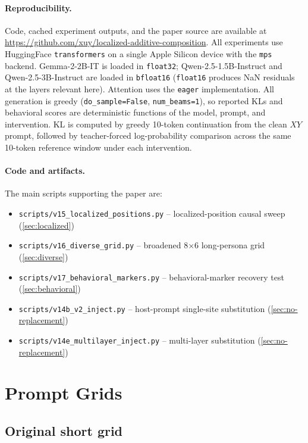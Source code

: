 \documentclass[11pt]{article}
\begin{document}
\paragraph{Reproducibility.}
Code, cached experiment outputs, and the paper source are available at \url{https://github.com/xuy/localized-additive-composition}. All experiments use HuggingFace \texttt{transformers} on a single Apple Silicon device with the \texttt{mps} backend. Gemma-2-2B-IT is loaded in \texttt{float32}; Qwen-2.5-1.5B-Instruct and Qwen-2.5-3B-Instruct are loaded in \texttt{bfloat16} (\texttt{float16} produces NaN residuals at the layers relevant here). Attention uses the \texttt{eager} implementation. All generation is greedy (\texttt{do\_sample=False}, \texttt{num\_beams=1}), so reported KLs and behavioral scores are deterministic functions of the model, prompt, and intervention. KL is computed by greedy 10-token continuation from the clean $XY$ prompt, followed by teacher-forced log-probability comparison across the same 10-token reference window under each intervention.

\paragraph{Code and artifacts.}
The main scripts supporting the paper are:
\begin{itemize}
    \item \texttt{scripts/v15\_localized\_positions.py} -- localized-position causal sweep (\cref{sec:localized})
    \item \texttt{scripts/v16\_diverse\_grid.py} -- broadened 8$\times$6 long-persona grid (\cref{sec:diverse})
    \item \texttt{scripts/v17\_behavioral\_markers.py} -- behavioral-marker recovery test (\cref{sec:behavioral})
    \item \texttt{scripts/v14b\_v2\_inject.py} -- host-prompt single-site substitution (\cref{sec:no-replacement})
    \item \texttt{scripts/v14e\_multilayer\_inject.py} -- multi-layer substitution (\cref{sec:no-replacement})
\end{itemize}

\appendix

\section{Prompt Grids}
\label{app:grid}

\subsection{Original short grid}
\end{document}
